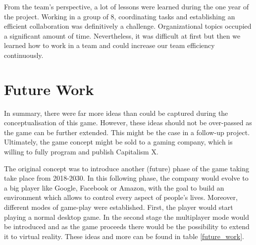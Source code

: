 \documentclass[11pt,titlepage,oneside,openany]{book}
\begin{document}
From the team's perspective, a lot of lessons were learned during the one year of the project. Working in a group of $8$, coordinating tasks and establishing an efficient collaboration was definitively a challenge. Organizational topics occupied a significant amount of time. Nevertheless, it was difficult at first but then we learned how to work in a team and could increase our team efficiency continuously.

\section{Future Work}
\label{sec:future}
In summary, there were far more ideas than could be captured during the conceptualisation of this game. However, these ideas should not be over-passed as the game can be further extended. This might be the case in a follow-up project. Ultimately, the game concept might be sold to a gaming company, which is willing to fully program and publish Capitalism X. 

The original concept was to introduce another (future) phase of the game taking take place from 2018-2030. In this following phase, the company would evolve to a big player like Google, Facebook or Amazon, with the goal to build an environment which allows to control every aspect of people’s lives. 
Moreover, different modes of game-play were established. First, the player would start playing a normal desktop game. In the second stage the multiplayer mode would be introduced and as the game proceeds there would be the possibility to extend it to virtual reality. These ideas and more can be found in table \ref{future_work}.
\end{document}
